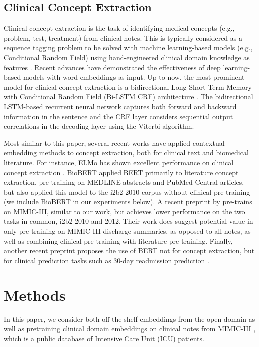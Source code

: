 \documentclass[11pt,a4paper]{article}
\begin{document}
\subsection{Clinical Concept Extraction}
Clinical concept extraction is the task of identifying medical concepts (e.g., problem, test, treatment) from clinical notes. This is typically considered as a sequence tagging problem to be solved with machine learning-based models (e.g., Conditional Random Field) using hand-engineered clinical domain knowledge as features \cite{wang2018clinical, de2011machine}. Recent advances have demonstrated the effectiveness of deep learning-based models with word embeddings as input. Up to now, the most prominent model for clinical concept extraction is a bidirectional Long Short-Term Memory with Conditional Random Field (Bi-LSTM CRF) architecture \cite{habibi2017deep,florez2018named,chalapathy2016bidirectional}. The bidirectional LSTM-based recurrent neural network captures both forward and backward information in the sentence and the CRF layer considers sequential output correlations in the decoding layer using the Viterbi algorithm. 

Most similar to this paper, several recent works have applied contextual embedding methods to concept extraction, both for clinical text and biomedical literature. For instance, ELMo has shown excellent performance on clinical concept extraction \cite{zhu2018clinical}. BioBERT \cite{lee2019biobert} applied BERT primarily to literature concept extraction, pre-training on MEDLINE abstracts and PubMed Central articles, but also applied this model to the i2b2 2010 corpus  without clinical pre-training (we include BioBERT in our experiments
below). A recent preprint by \cite{alsentzer2019publicly} pre-trains on MIMIC-III, similar to our work, but achieves lower performance on the two tasks in common, i2b2 2010 and 2012. Their work does suggest potential value in only pre-training on MIMIC-III discharge summaries, as opposed to all notes, as well as combining clinical pre-training with literature pre-training. Finally, another recent preprint 
proposes the use of BERT not for concept extraction, but for clinical prediction tasks such as 30-day 
readmission prediction \cite{huang2019clinicalbert}.

\section{Methods}
In this paper, we consider both off-the-shelf embeddings from the open domain as well as pretraining clinical domain embeddings on clinical notes from MIMIC-III \cite{johnson2016mimic}, which is a public database of Intensive Care Unit (ICU) patients.
\end{document}
